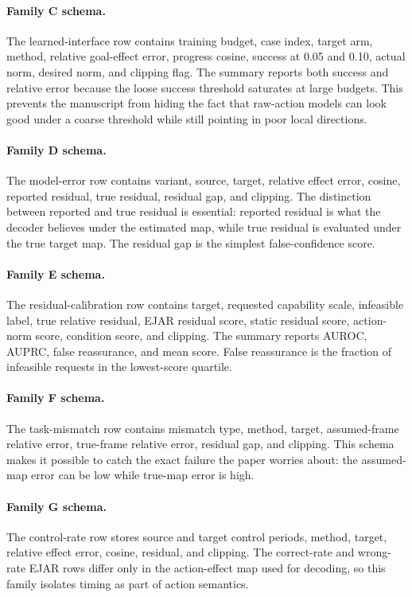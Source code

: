 \documentclass{article}
\begin{document}
\paragraph{Family C schema.}
The learned-interface row contains training budget, case index, target arm, method, relative goal-effect error, progress cosine, success at 0.05 and 0.10, actual norm, desired norm, and clipping flag. The summary reports both success and relative error because the loose success threshold saturates at large budgets. This prevents the manuscript from hiding the fact that raw-action models can look good under a coarse threshold while still pointing in poor local directions.

\paragraph{Family D schema.}
The model-error row contains variant, source, target, relative effect error, cosine, reported residual, true residual, residual gap, and clipping. The distinction between reported and true residual is essential: reported residual is what the decoder believes under the estimated map, while true residual is evaluated under the true target map. The residual gap is the simplest false-confidence score.

\paragraph{Family E schema.}
The residual-calibration row contains target, requested capability scale, infeasible label, true relative residual, EJAR residual score, static residual score, action-norm score, condition score, and clipping. The summary reports AUROC, AUPRC, false reassurance, and mean score. False reassurance is the fraction of infeasible requests in the lowest-score quartile.

\paragraph{Family F schema.}
The task-mismatch row contains mismatch type, method, target, assumed-frame relative error, true-frame relative error, residual gap, and clipping. This schema makes it possible to catch the exact failure the paper worries about: the assumed-map error can be low while true-map error is high.

\paragraph{Family G schema.}
The control-rate row stores source and target control periods, method, target, relative effect error, cosine, residual, and clipping. The correct-rate and wrong-rate EJAR rows differ only in the action-effect map used for decoding, so this family isolates timing as part of action semantics.
\end{document}
